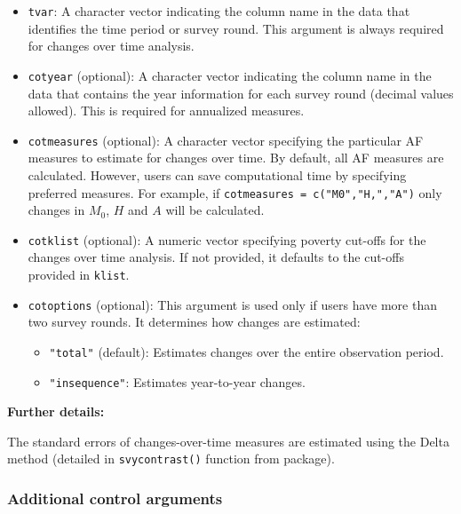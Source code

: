 \begin{itemize}
\item
  \texttt{tvar}: A character vector indicating the column name in the data that identifies the time period or survey round. This argument is always required for changes over time analysis.
\item
  \texttt{cotyear} (optional): A character vector indicating the column name in the data that contains the year information for each survey round (decimal values allowed). This is required for annualized measures.
\item
  \texttt{cotmeasures} (optional): A character vector specifying the particular AF measures to estimate for changes over time. By default, all AF measures are calculated. However, users can save computational time by specifying preferred measures. For example, if \texttt{cotmeasures\ =\ c("M0","H,","A")} only changes in \(M_0\), \(H\) and \(A\) will be calculated.
\item
  \texttt{cotklist} (optional): A numeric vector specifying poverty cut-offs for the changes over time analysis. If not provided, it defaults to the cut-offs provided in \texttt{klist}.
\item
  \texttt{cotoptions} (optional): This argument is used only if users have more than two survey rounds. It determines how changes are estimated:

  \begin{itemize}
  \item
    \texttt{"total"} (default): Estimates changes over the entire observation period.
  \item
    \texttt{"insequence"}: Estimates year-to-year changes.
  \end{itemize}
\end{itemize}

\textbf{Further details:}

The standard errors of changes-over-time measures are estimated using the Delta method (detailed in \texttt{svycontrast()} function from  package).

\subsubsection{Additional control arguments}\label{additional-control-arguments}

